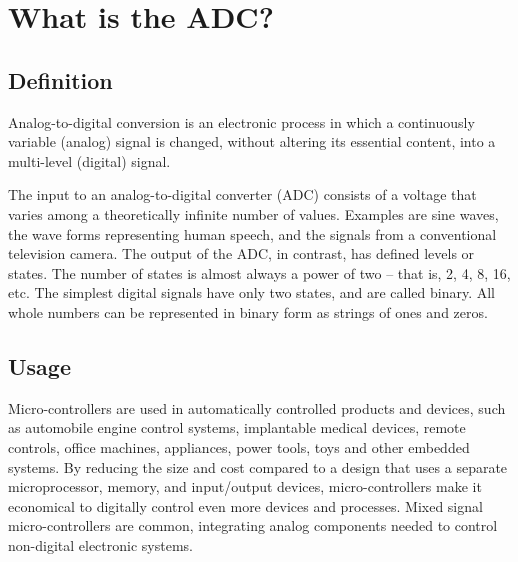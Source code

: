 \section{What is the ADC?}

\subsection{Definition}
Analog-to-digital conversion is an electronic process in which a continuously variable (analog) signal is changed, without altering its essential content, into a multi-level (digital) signal.

The input to an analog-to-digital converter (ADC) consists of a voltage that varies among a theoretically infinite number of values. Examples are sine waves, the wave forms representing human speech, and the signals from a conventional television camera. The output of the ADC, in contrast, has defined levels or states. The number of states is almost always a power of two -- that is, 2, 4, 8, 16, etc. The simplest digital signals have only two states, and are called binary. All whole numbers can be represented in binary form as strings of ones and zeros.


\subsection{Usage}
Micro-controllers are used in automatically controlled products and devices, such as automobile engine control systems, implantable medical devices, remote controls, office machines, appliances, power tools, toys and other embedded systems. By reducing the size and cost compared to a design that uses a separate microprocessor, memory, and input/output devices, micro-controllers make it economical to digitally control even more devices and processes. Mixed signal micro-controllers are common, integrating analog components needed to control non-digital electronic systems.


